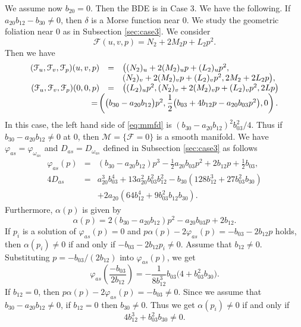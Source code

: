 \documentclass[a4paper, 12pt]{article}
\theoremstyle{definition}
\numberwithin{equation}{section}
\begin{document}
We assume now $b_{20}=0$. 
Then the BDE is in Case 3.
We have the following.
If $a_{20} b_{12} - b_{30}\ne0$, then
$\delta$ is a Morse function near $0$.
We study the geometric foliation near $0$ 
as in Subsection \ref{sec:case3}.
We consider
$$
{\mathcal{F}}(u,v,p)=
N_2+2M_2p+L_2p^2.
$$
Then we have
$$
\begin{array}{rcl}
({\mathcal{F}}_u,{\mathcal{F}}_v,{\mathcal{F}}_p)(u,v,p)
&=&
\big( (N_2)_u+2 (M_2)_up+ (L_2)_up^2,\\
&&\hspace{0mm}
 (N_2)_v+2 (M_2)_vp+ (L_2)_vp^2,
2 M_2+2 L_2p\big),\\
({\mathcal{F}}_u,{\mathcal{F}}_v,{\mathcal{F}}_p)(0,0,p)
&=&
\big( (L_2)_up^2,
 (N_2)_v+2 (M_2)_vp+ (L_2)_vp^2,
2 Lp\big)\\
&\hspace{-14mm}=&\hspace{-10mm}
\left(\big(b_{30}-a_{20} b_{12}\big) p^2,
\dfrac{1}{2}\big(b_{03}+4 b_{12} p-a_{20} b_{03} p^2\big),
0\right).
\end{array}
$$
In this case, the
left hand side of
\eqref{eq:mmfd}
is $(b_{30}-a_{20}b_{12})^2b_{03}^2/4$.
Thus if $b_{30}-a_{20}b_{12}\ne0$ at $0$,
then ${\mathcal{M}}=\{{\mathcal{F}}=0\}$ is a smooth manifold.
We have ${\varphi}_{as}={\varphi}_{\omega_{as}}$ 
and $D_{as}=D_{\omega_{as}}$ 
defined in Subsection \ref{sec:case3}
as follows
$$
\begin{array}{rcL}
{\varphi}_{as}(p)&=&
 (b_{30}-a_{20} b_{12}) p^3
-\frac{1}{2} a_{20} b_{03} p^2
+2 b_{12} p
+\frac{1}{2}b_{03},\\[2mm]
4D_{as}
&=&
 a_{20}^3 b_{03}^4
+13 a_{20}^2 b_{03}^2 b_{12}^2
-b_{30} (128 b_{12}^3+27 b_{03}^2 b_{30})\\
&&
+2 a_{20} (64 b_{12}^4+9 b_{03}^2 b_{12} b_{30}).
\end{array}
$$
Furthermore, $\alpha(p)$ 
is given by
$$
\alpha(p)=
2 (b_{30}-a_{20} b_{12}) p^2-a_{20} b_{03} p+2 b_{12}.
$$
If $p_i$ is a solution of ${\varphi}_{as}(p)=0$ and
$p\alpha(p)-2{\varphi}_{as}(p)=-b_{03} - 2 b_{12} p$ holds,
then $\alpha(p_i)\ne0$ if and only if $-b_{03} - 2 b_{12} p_i\ne0$.
Assume that $b_{12}\ne0$.
Substituting $p=-b_{03}/(2 b_{12})$ into ${\varphi}_{as}(p)$,
we get
$$
{\varphi}_{as}\left(\dfrac{-b_{03}}{2 b_{12}}\right)
=
-\dfrac{1}{8b_{12}^3} b_{03} \big(4 + b_{03}^2 b_{30}\big).
$$
If $b_{12}=0$, then $p\alpha(p)-2{\varphi}_{as}(p)=-b_{03}\ne0$.
Since we assume that $b_{30}-a_{20} b_{12}\ne0$,
 if $b_{12}=0$ then $b_{30}\ne0$.
Thus we get
$\alpha(p_i)\ne0$ if and only if
$$
4b_{12}^3 + b_{03}^2 b_{30}\ne0.
$$
\end{document}
